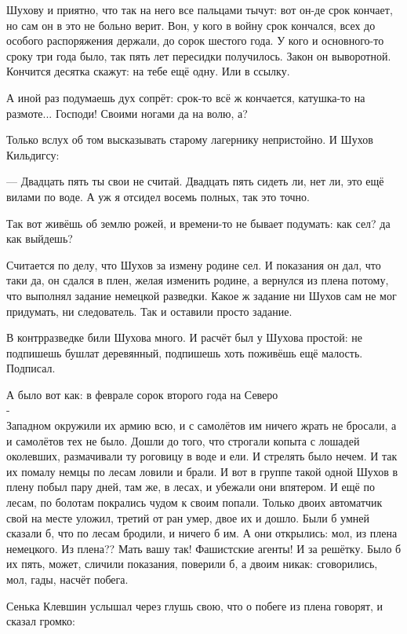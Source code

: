 Шухову и приятно, что так на него все пальцами тычут: вот он-де срок кончает, \dash но сам он в это
не больно верит. Вон, у кого в войну срок кончался, всех до особого распоряжения держали, до
сорок шестого года. У кого и основного-то сроку три года было, так пять лет пересидки
получилось. Закон \dash он выворотной. Кончится десятка \dash скажут: на тебе ещё одну. Или в ссылку.

А иной раз подумаешь \dash дух сопрёт: срок-то всё ж кончается, катушка-то на размоте... Господи!
Своими ногами \dash да на волю, а?

Только вслух об том высказывать старому лагернику непристойно. И Шухов Кильдигсу:

--- Двадцать пять ты свои не считай. Двадцать пять сидеть ли, нет ли, это ещё вилами по воде. А
уж я отсидел восемь полных, так это точно.

Так вот живёшь об землю рожей, и времени-то не бывает подумать: как сел? да как выйдешь?

Считается по делу, что Шухов за измену родине сел. И показания он дал, что таки да, он сдался в
плен, желая изменить родине, а вернулся из плена потому, что выполнял задание немецкой
разведки. Какое ж задание \dash ни Шухов сам не мог придумать, ни следователь. Так и оставили
просто \dash задание.

В контрразведке били Шухова много. И расчёт был у Шухова простой: не подпишешь \dash бушлат
деревянный, подпишешь \dash хоть поживёшь ещё малость. Подписал.

А было вот как: в феврале сорок второго года на Северо\\-\\Западном окружили их армию всю, и с
самолётов им ничего жрать не бросали, а и самолётов тех не было. Дошли до того, что строгали
копыта с лошадей околевших, размачивали ту роговицу в воде и ели. И стрелять было нечем. И так
их помалу немцы по лесам ловили и брали. И вот в группе такой одной Шухов в плену побыл пару
дней, там же, в лесах, \dash и убежали они впятером. И ещё по лесам, по болотам покрались \dash чудом к
своим попали. Только двоих автоматчик свой на месте уложил, третий от ран умер, \dash двое их и
дошло. Были б умней \dash сказали б, что по лесам бродили, и ничего б им. А они открылись: мол, из
плена немецкого. Из плена?? Мать вашу так! Фашистские агенты! И за решётку. Было б их пять,
может, сличили показания, поверили б, а двоим никак: сговорились, мол, гады, насчёт побега.

Сенька Клевшин услышал через глушь свою, что о побеге из плена говорят, и сказал громко:

